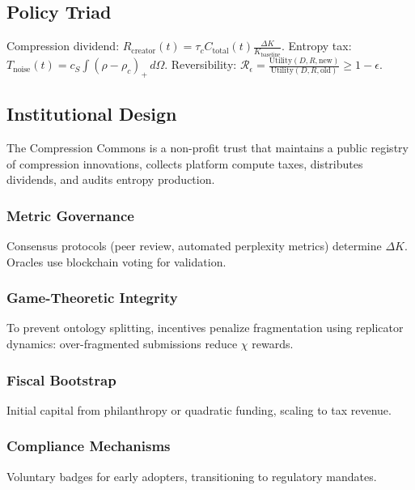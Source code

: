 \documentclass[12pt]{article}
\begin{document}
\subsection{Policy Triad}

Compression dividend: \( R_{\text{creator}}(t) = \tau_c C_{\text{total}}(t) \frac{\Delta K}{K_{\text{baseline}}} \). Entropy tax: \( T_{\text{noise}}(t) = c_S \int (\rho - \rho_c)_+ \, d\Omega \). Reversibility: \(\mathcal{R}_\epsilon = \frac{\text{Utility}(D, R, \text{new})}{\text{Utility}(D, R, \text{old})} \geq 1 - \epsilon\).

\subsection{Institutional Design}

The Compression Commons is a non-profit trust that maintains a public registry of compression innovations, collects platform compute taxes, distributes dividends, and audits entropy production.

\subsubsection{Metric Governance}

Consensus protocols (peer review, automated perplexity metrics) determine \(\Delta K\). Oracles use blockchain voting for validation.

\subsubsection{Game-Theoretic Integrity}

To prevent ontology splitting, incentives penalize fragmentation using replicator dynamics: over-fragmented submissions reduce \(\chi\) rewards.

\subsubsection{Fiscal Bootstrap}

Initial capital from philanthropy or quadratic funding, scaling to tax revenue.

\subsubsection{Compliance Mechanisms}

Voluntary badges for early adopters, transitioning to regulatory mandates.
\end{document}
